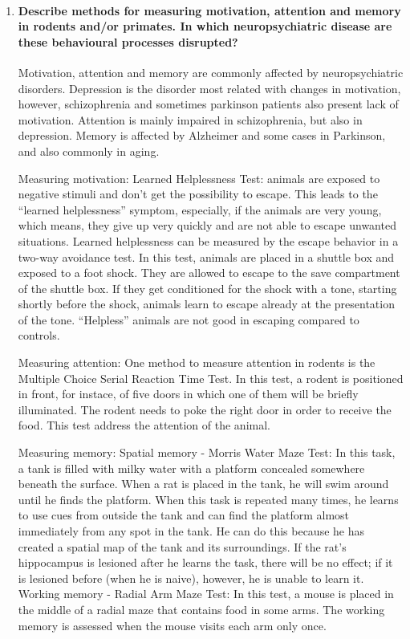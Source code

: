 \documentclass[12pt,article,oneside,a4paper]{memoir}
\begin{document}
\begin{enumerate}
\item \paragraph{Describe methods for measuring motivation, attention and
memory in rodents and/or primates. In which neuropsychiatric disease are these
behavioural processes disrupted?}

Motivation, attention and memory are commonly affected by neuropsychiatric
disorders. Depression is the disorder most related with changes in motivation,
however, schizophrenia and sometimes parkinson patients also present lack of
motivation. Attention is mainly impaired in schizophrenia, but also in
depression. Memory is affected by Alzheimer and some cases in Parkinson, and also commonly in aging.

Measuring motivation:
Learned Helplessness Test: animals are exposed to negative stimuli and don't
get the possibility to escape. This leads to the ``learned helplessness''
symptom, especially, if the animals are very young, which means, they give up
very quickly and are not able to escape unwanted situations. Learned
helplessness can be measured by the escape behavior in a two-way avoidance
test. In this test, animals are placed in a shuttle box and exposed to a foot
shock. They are allowed to escape to the save compartment of the shuttle box.
If they get conditioned for the shock with a tone, starting shortly before the
shock, animals learn to escape already at the presentation of the tone.
``Helpless'' animals are not good in escaping compared to controls.

Measuring attention:
One method to measure attention in rodents is the Multiple Choice Serial
Reaction Time Test. In this test, a rodent is positioned in front, for instace,
of five doors in which one of them will be briefly illuminated. The rodent
needs to poke the right door in order to receive the food. This test address
the attention of the animal.

Measuring memory:
Spatial memory - Morris Water Maze Test: In this task, a tank is filled with
milky water with a platform concealed somewhere beneath the surface. When a rat
is placed in the tank, he will swim around until he finds the platform. When
this task is repeated many times, he learns to use cues from outside the tank
and can find the platform almost immediately from any spot in the tank. He can
do this because he has created a spatial map of the tank and its surroundings.
If the rat's hippocampus is lesioned after he learns the task, there will be no
effect; if it is lesioned before (when he is naive), however, he is unable to
learn it.
Working memory - Radial Arm Maze Test: In this test, a mouse is placed in the
middle of a radial maze that contains food in some arms. The working memory is
assessed when the mouse visits each arm only once. 


\end{enumerate}
\end{document}
